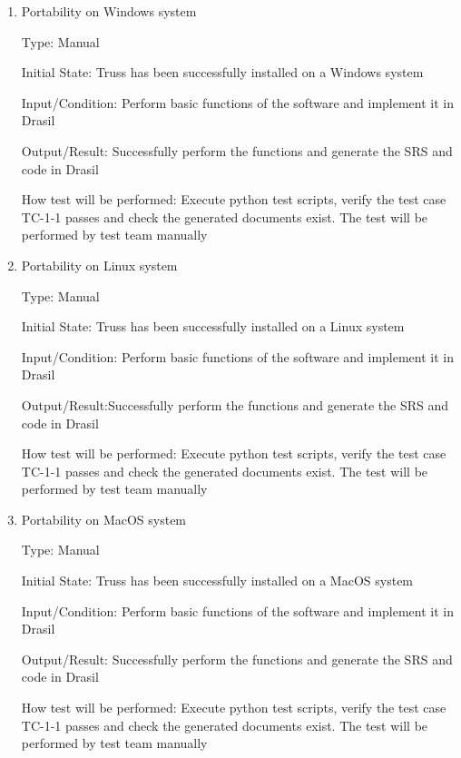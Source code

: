\documentclass[12pt, titlepage]{article}
\begin{document}
\begin{enumerate}
	
	\item{Portability on Windows system\\}
	
	Type: Manual
	
	Initial State: Truss has been successfully installed on a Windows system
	
	Input/Condition: Perform basic functions of the software and implement 
	it in Drasil
	
	Output/Result: Successfully perform the functions and generate the SRS and 
	code in Drasil
	
	How test will be performed: Execute python test scripts, verify the test 
	case TC-1-1 passes and check the generated documents exist. The test will 
	be performed by test team manually
	
	\item{Portability on Linux system\\}
	
	Type: Manual
	
	Initial State: Truss has been successfully installed on a Linux system
	
	Input/Condition: Perform basic functions of the software and implement 
	it in Drasil
	
	Output/Result:Successfully perform the functions and generate the SRS and 
	code in Drasil
	
	How test will be performed: Execute python test scripts, verify the test 
	case TC-1-1 passes and check the generated documents exist. The test will 
	be performed by test team manually
	
		
	\item{Portability on MacOS system\\}
	
	Type: Manual
	
	Initial State: Truss has been successfully installed on a MacOS system
	
	Input/Condition: Perform basic functions of the software and implement 
	it in Drasil
	
	Output/Result: Successfully perform the functions and generate the SRS and 
	code in Drasil
	
	How test will be performed: Execute python test scripts, verify the test 
	case TC-1-1 passes and check the generated documents exist. The test will 
	be performed by test team manually

\end{enumerate}
\end{document}
